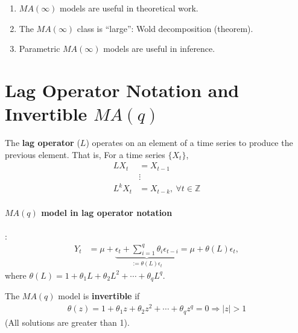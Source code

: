 \documentclass[11pt]{elegantbook}
\begin{document}
\begin{remark}
    \begin{enumerate}
        \item $MA(\infty)$ models are useful in theoretical work.
        \item The $MA(\infty)$ class is ``large'': Wold decomposition (theorem).
        \item Parametric $MA(\infty)$ models are useful in inference.
    \end{enumerate}
\end{remark}


\section{Lag Operator Notation and Invertible $MA(q)$}
\begin{definition}
    The \textbf{lag operator} ($L$) operates on an element of a time series to produce the previous element. That is, For a time series $\{X_t\}$,
    \begin{equation}
        \begin{aligned}
            L X_t&=X_{t-1}\\
            &\vdots\\
            L^k X_t&=X_{t-k},\ \forall t\in \mathbb{Z}
        \end{aligned}
        \nonumber
    \end{equation}
\end{definition}
\paragraph*{$MA(q)$ model in lag operator notation}:
\begin{equation}
    \begin{aligned}
        Y_t&=\mu+\underbrace{\epsilon_t+\sum_{i=1}^{q}\theta_i\epsilon_{t-i}}_{:=\theta(L)\epsilon_t}=\mu + \theta(L)\epsilon_t,
    \end{aligned}
    \nonumber
\end{equation}
where $\theta(L)=1+\theta_1 L + \theta_2 L^2 + \cdots + \theta_q L^q$.
\begin{definition}[Invertibility of $MA(q)$]
    The $MA(q)$ model is \textbf{invertible} if \begin{equation}
        \begin{aligned}
            \theta(z)=1+\theta_1 z + \theta_2 z^2 + \cdots + \theta_q z^q=0 \Rightarrow |z|>1
        \end{aligned}
        \nonumber
    \end{equation}
    (All solutions are greater than 1).
\end{definition}
\end{document}
